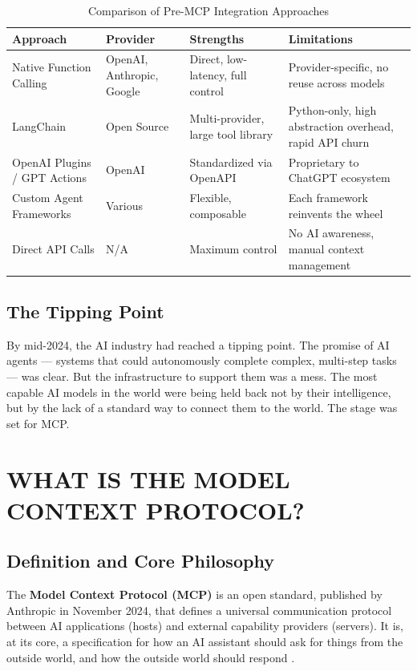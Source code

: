 \begin{table}[H]
    \centering
    \caption{Comparison of Pre-MCP Integration Approaches}
    \label{tab:pre_mcp_comparison}
    \begin{tabular}{|>{\raggedright\arraybackslash}p{2.8cm}|>{\raggedright\arraybackslash}p{3.0cm}|>{\raggedright\arraybackslash}p{3.5cm}|>{\raggedright\arraybackslash}p{3.5cm}|}
        \hline
        \textbf{Approach} & \textbf{Provider} & \textbf{Strengths} & \textbf{Limitations} \\ \hline
        Native Function Calling & OpenAI, Anthropic, Google & Direct, low-latency, full control & Provider-specific, no reuse across models \\ \hline
        LangChain & Open Source & Multi-provider, large tool library & Python-only, high abstraction overhead, rapid API churn \\ \hline
        OpenAI Plugins / GPT Actions & OpenAI & Standardized via OpenAPI & Proprietary to ChatGPT ecosystem \\ \hline
        Custom Agent Frameworks & Various & Flexible, composable & Each framework reinvents the wheel \\ \hline
        Direct API Calls & N/A & Maximum control & No AI awareness, manual context management \\ \hline
    \end{tabular}
\end{table}

\section{The Tipping Point}
By mid-2024, the AI industry had reached a tipping point. The promise of AI agents — systems that could autonomously complete complex, multi-step tasks — was clear. But the infrastructure to support them was a mess. The most capable AI models in the world were being held back not by their intelligence, but by the lack of a standard way to connect them to the world. The stage was set for MCP.

\chapter{WHAT IS THE MODEL CONTEXT PROTOCOL?}

\section{Definition and Core Philosophy}
The \textbf{Model Context Protocol (MCP)} is an open standard, published by Anthropic in November 2024, that defines a universal communication protocol between AI applications (hosts) and external capability providers (servers). It is, at its core, a specification for how an AI assistant should ask for things from the outside world, and how the outside world should respond \cite{anthropic2024mcp}.

